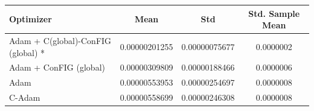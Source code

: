 \begin{table}[H]
    \centering
    \label{tab:optimizer_results}
    \begin{tabular}{lccc}
        \toprule
        \textbf{Optimizer} & \textbf{Mean} & \textbf{Std} & \textbf{Std. Sample Mean} \\
        \midrule
        Adam + C(global)-ConFIG (global) * & 0.00000201255 & 0.00000075677 & 0.0000002 \\
        Adam + ConFIG (global) & 0.00000309809 & 0.00000188466 & 0.0000006 \\
        Adam & 0.00000553953 & 0.00000254697 & 0.0000008 \\
        C-Adam & 0.00000558699 & 0.00000246308 & 0.0000008 \\
        \bottomrule
    \end{tabular}
\end{table}
